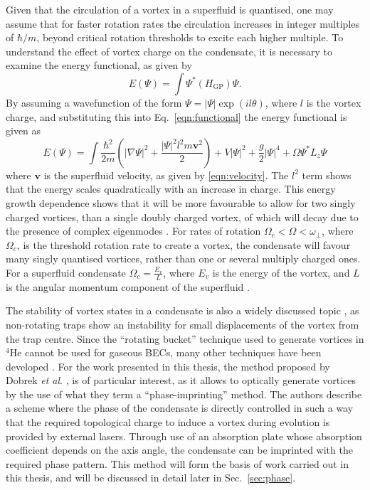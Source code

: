Given that the circulation of a vortex in a superfluid is quantised, one may assume that for faster rotation rates the circulation increases in integer multiples of $\hbar/m$, beyond critical rotation thresholds to excite each higher multiple. To understand the effect of vortex charge on the condensate, it is necessary to examine the energy functional, as given by
    \begin{equation}\label{eqn:functional}
        E(\Psi) = \int \Psi^{*} (H_{\text{GP}}) \Psi.
    \end{equation}
By assuming a wavefunction of the form $\Psi = |\Psi|\exp(il\theta)$, where $l$ is the vortex charge, and substituting this into Eq.~\eqref{eqn:functional} the energy functional is given as
\begin{equation}\label{eqn:functional_full}
    E(\Psi) = \int \frac{\hbar^2}{2m} \left(|\nabla\Psi|^2  + \frac{|\Psi|^2 l^2 m \mathbf{v}^2}{2}  \right) + V|\Psi|^2 + \frac{g}{2}|\Psi|^4 + \Omega \Psi^{*} L_z \Psi
\end{equation}
where $\mathbf{v}$ is the superfluid velocity, as given by \eqref{eqn:velocity}. The $l^2$ term shows that the energy scales quadratically with an increase in charge. This energy growth dependence shows that it will be more favourable to allow for two singly charged vortices, than a single doubly charged vortex, of which will decay due to the presence of complex eigenmodes \cite{VTX:Kawaguchi_pra_2004}. For rates of rotation $\Omega_c < \Omega < \omega_\perp$, where $\Omega_c$, is the threshold rotation rate to create a vortex, the condensate will favour many singly quantised vortices, rather than one or several multiply charged ones. For a superfluid condensate $\Omega_c = \frac{E_v}{L}$, where $E_v$ is the energy of the vortex, and $L$ is the angular momentum component of the superfluid \cite{BK:Pitaevskii_Stringari_2003}.

The stability of vortex states in a condensate is also a widely discussed topic \cite{Vtx:Fedichev_pra_1999,Vtx:Feder_prl_1999}, as non-rotating traps show an instability for small displacements of the vortex from the trap centre. Since the ``rotating bucket'' technique used to generate vortices in $^4$He cannot be used for gaseous BECs, many other techniques have been developed \cite{Vtx:Anglin_prl_1999,Vtx:Davies_prl_1999,Vtx:Marshall_pra_1999,Vtx:Dobrek_pra_1999,VTX:Nakahara_physb_2000}. For the work presented in this thesis, the method proposed by Dobrek \textit{et al}. \cite{Vtx:Dobrek_pra_1999}, is of particular interest, as it allows to optically generate vortices by the use of what they term a ``phase-imprinting'' method. The authors describe a scheme where the phase of the condensate is directly controlled in such a way that the required topological charge to induce a vortex during evolution is provided by external lasers. Through use of an absorption plate whose absorption coefficient depends on the axis angle, the condensate can be imprinted with the required phase pattern. This method will form the basis of work carried out in this thesis, and will be discussed in detail later in Sec.~\ref{sec:phase}.


